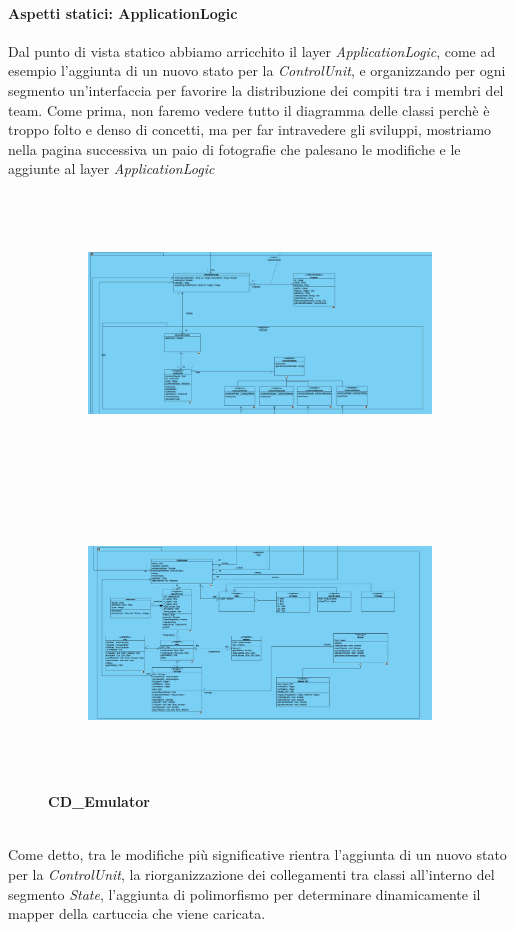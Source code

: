 \documentclass[11pt]{article}
\begin{document}
\paragraph{Aspetti statici: ApplicationLogic}
Dal punto di vista statico abbiamo arricchito il layer \emph{ApplicationLogic}, come ad esempio l'aggiunta di un nuovo stato per la \emph{ControlUnit}, e organizzando per ogni segmento un'interfaccia per favorire la distribuzione dei compiti tra i membri del team. Come prima, non faremo vedere tutto il diagramma delle classi perchè è troppo folto e denso di concetti, ma per far intravedere gli sviluppi, mostriamo nella pagina successiva un paio di fotografie che palesano le modifiche e le aggiunte al layer \emph{ApplicationLogic}
\begin{figure}[!h]
\vspace*{-4cm}

\centering
	\begin{subfigure}{600px}
	\hspace*{-4.3cm}
	\includegraphics[width=600px, height=281px]{CD_Emulator_1.png}\\
	\end{subfigure}
	\begin{subfigure}{600px}
	\hspace*{-4.3cm}
	\includegraphics[width=600px, height=281px]{CD_Emulator_2.png}\\
	\end{subfigure}
	\small\textbf{CD\_Emulator}
\end{figure}\\
Come detto, tra le modifiche più significative rientra l'aggiunta di un nuovo stato per la \emph{ControlUnit}, la riorganizzazione dei collegamenti tra classi all'interno del segmento \emph{State}, l'aggiunta di polimorfismo per determinare dinamicamente il mapper della cartuccia che viene caricata.
\clearpage
\end{document}
